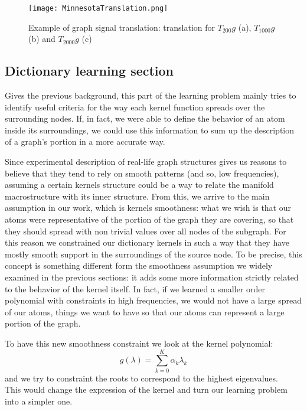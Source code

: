 \begin{figure}[tb]
  \centering
  \texttt{[image: MinnesotaTranslation.png]}
  \caption{Example of graph signal translation: translation for $T_{200}g$ (a), $T_{1000}g$ (b) and $T_{2000}g$ (c)}
  \label{fig:minnesota}
\end{figure}

\subsection{Dictionary learning section}
\label{sec:2implementations}
Gives the previous background, this part of the learning problem mainly tries to identify useful criteria for the way each kernel function spreads over the surrounding nodes. If, in fact, we were able to define the behavior of an atom inside its surroundings, we could use this information to sum up the description of a graph's portion in a more accurate way.

Since experimental description of real-life graph structures gives us reasons to believe that they tend to rely on smooth patterns (and so, low frequencies), assuming a certain kernels structure could be a way to relate the manifold macrostructure with its inner structure. From this, we arrive to the main assumption in our work, which is kernels smoothness: what we wish is that our atoms were representative of the portion of the graph they are covering, so that they should spread with non trivial values over all nodes of the subgraph. For this reason we constrained our dictionary kernels in such a way that they have mostly smooth support in the surroundings of the source node. To  be precise, this concept is something different form the smoothness assumption we widely examined in the previous sections: it adds some more information strictly related to the behavior of the kernel itself. In fact, if we learned a smaller order polynomial with constraints in high frequencies, we would not have a large spread of our atoms, things we want to have so that our atoms can represent a large portion of the graph.

To have this new smoothness constraint we look at the kernel polynomial:
\begin{equation}
g(\lambda) = \sum_{k=0}^{K}\alpha_k \lambda_k
\end{equation}
and we try to constraint the roots to correspond to the highest eigenvalues.\\
This would change the expression of the kernel and turn our learning problem into a simpler one.

